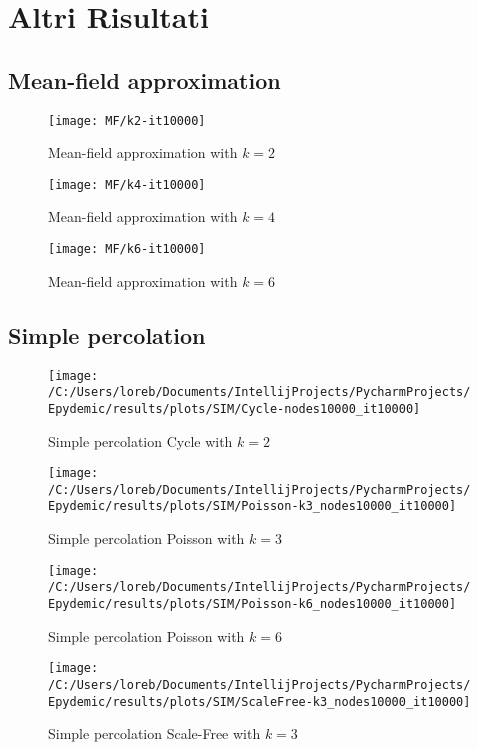 \section{Altri Risultati}\label{sec:altri-risultati}
\subsection{Mean-field approximation}\label{subsec:app-mean-field-approximation}
    \begin{figure}[H]
        \texttt{[image: MF/k2-it10000]}\caption{Mean-field approximation with $k=2$}
        \label{fig:mf_k_2}
    \end{figure}
    \begin{figure}[H]
        \texttt{[image: MF/k4-it10000]}\caption{Mean-field approximation with $k=4$}
        \label{fig:mf_k_4}
    \end{figure}
    \begin{figure}[H]
        \texttt{[image: MF/k6-it10000]}\caption{Mean-field approximation with $k=6$}
        \label{fig:mf_k_6}
    \end{figure}

\subsection{Simple percolation}\label{subsec:app-simple-percolation}
    \begin{figure}[H]
        \texttt{[image: /C:/Users/loreb/Documents/IntellijProjects/PycharmProjects/Epydemic/results/plots/SIM/Cycle-nodes10000\_it10000]}\caption{Simple percolation Cycle with $k=2$}
        \label{fig:sim_cycle}
    \end{figure}
    \begin{figure}[H]
        \texttt{[image: /C:/Users/loreb/Documents/IntellijProjects/PycharmProjects/Epydemic/results/plots/SIM/Poisson-k3\_nodes10000\_it10000]}\caption{Simple percolation Poisson with $k=3$}
        \label{fig:sim_poisson_k_3}
    \end{figure}
    \begin{figure}[H]
        \texttt{[image: /C:/Users/loreb/Documents/IntellijProjects/PycharmProjects/Epydemic/results/plots/SIM/Poisson-k6\_nodes10000\_it10000]}\caption{Simple percolation Poisson with $k=6$}
        \label{fig:sim_poisson_k_6}
    \end{figure}
    \begin{figure}[H]
        \texttt{[image: /C:/Users/loreb/Documents/IntellijProjects/PycharmProjects/Epydemic/results/plots/SIM/ScaleFree-k3\_nodes10000\_it10000]}\caption{Simple percolation Scale-Free with $k=3$}
        \label{fig:sim_scale_free_k_3}
    \end{figure}

